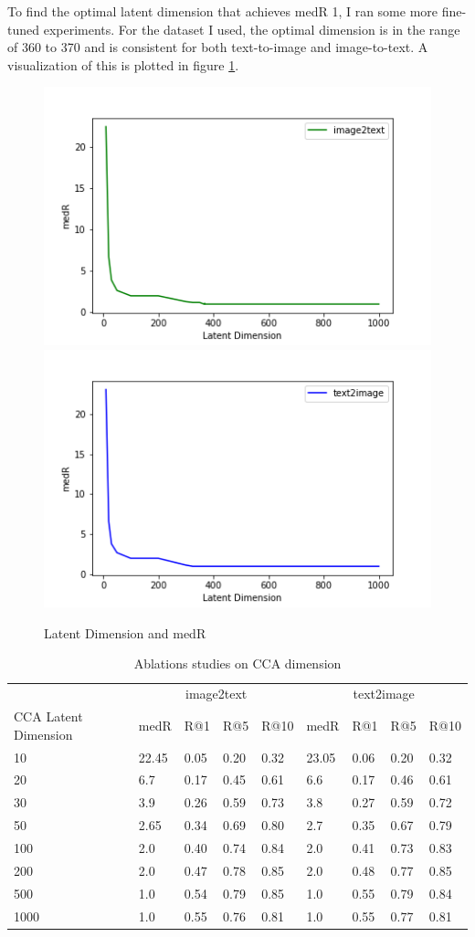 \documentclass[12pt, titlepage]{article}
\begin{document}
To find the optimal latent dimension that achieves medR 1, I ran some more fine-tuned experiments. For the dataset I used, the optimal dimension is in the range of 360 to 370 and is consistent for both text-to-image and image-to-text. A visualization of this is plotted in figure \ref{fig:fig1}.


\begin{figure}
\begin{center}
  \includegraphics[width=0.45\linewidth]{img/image2text.png}
  \includegraphics[width=0.45\linewidth]{img/text2image.png}
\end{center}
   \caption{Latent Dimension and medR}
\label{fig:fig1}
\end{figure}


\begin{table}[]
\begin{center}
\caption{Ablations studies on CCA dimension}
\label{tab:cca-dim}
\begin{tabular}{|l|llll|llll|}
\hline
         & \multicolumn{4}{c}{image2text} & \multicolumn{4}{|c|}{text2image} \\ \cline{2-9}
CCA Latent Dimension & medR   & R@1   & R@5   & R@10  & medR   & R@1   & R@5   & R@10  \\ \cline{1-9}
10   & 22.45  & 0.05  & 0.20  & 0.32  & 23.05  & 0.06  & 0.20  & 0.32  \\
20   & 6.7    & 0.17  & 0.45  & 0.61  & 6.6    & 0.17  & 0.46  & 0.61  \\
30   & 3.9    & 0.26  & 0.59  & 0.73  & 3.8    & 0.27  & 0.59  & 0.72  \\
50   & 2.65   & 0.34  & 0.69  & 0.80  & 2.7    & 0.35  & 0.67  & 0.79  \\
100  & 2.0    & 0.40  & 0.74  & 0.84  & 2.0    & 0.41  & 0.73  & 0.83  \\
200  & 2.0    & 0.47  & 0.78  & 0.85  & 2.0    & 0.48  & 0.77  & 0.85  \\
500  & 1.0    & 0.54  & 0.79  & 0.85  & 1.0    & 0.55  & 0.79  & 0.84  \\
1000 & 1.0    & 0.55  & 0.76  & 0.81  & 1.0    & 0.55  & 0.77  & 0.81  \\
\hline
\end{tabular}
\end{center}
\end{table}
\end{document}

